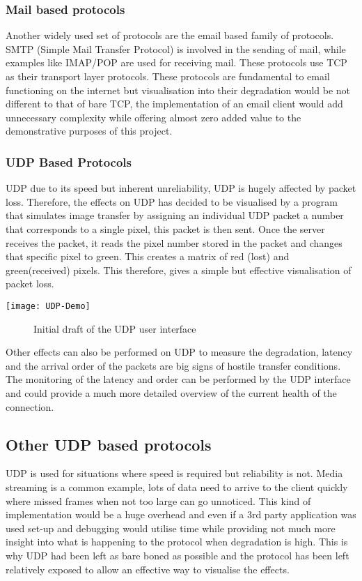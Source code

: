 \subsubsection*{Mail based protocols}
Another widely used set of protocols are the email based family of protocols. SMTP (Simple Mail Transfer Protocol) is involved in the sending of mail, while examples like IMAP/POP are used for receiving mail. These protocols use TCP as their transport layer protocols. These protocols are fundamental to email functioning on the internet but visualisation into their degradation would be not different to that of bare TCP, the implementation of an email client would add unnecessary complexity while offering almost zero added value to the demonstrative purposes of this project.



\subsubsection{UDP Based Protocols}
UDP due to its speed but inherent unreliability, UDP is hugely affected by packet loss. Therefore, the effects on UDP has decided to be visualised by a program that simulates image transfer by assigning an individual UDP packet a number that corresponds to a single pixel, this packet is then sent. Once the server receives the packet, it reads the pixel number stored in the packet and changes that specific pixel to green. This creates a matrix of red (lost) and green(received) pixels. This therefore, gives a simple but effective visualisation of packet loss. 

\begin{center}
\texttt{[image: UDP-Demo]}
	\begin{figure}[h]
		\caption{Initial draft of the UDP user interface}
	\end{figure}
\end{center}

Other effects can also be performed on UDP to measure the degradation, latency and the arrival order of the packets are big signs of hostile transfer conditions. The monitoring of the latency and order can be performed by the UDP interface and could provide a much more detailed overview of the current health of the connection.

\subsection*{Other UDP based protocols}
UDP is used for situations where speed is required but reliability is not. Media streaming is a common example, lots of data need to arrive to the client quickly where missed frames when not too large can go unnoticed. This kind of implementation would be a huge overhead and even if a 3rd party application was used set-up and debugging would utilise time while providing not much more insight into what is happening to the protocol when degradation is high. This is why UDP had been left as bare boned as possible and the protocol has been left relatively exposed to allow an effective way to visualise the effects.

